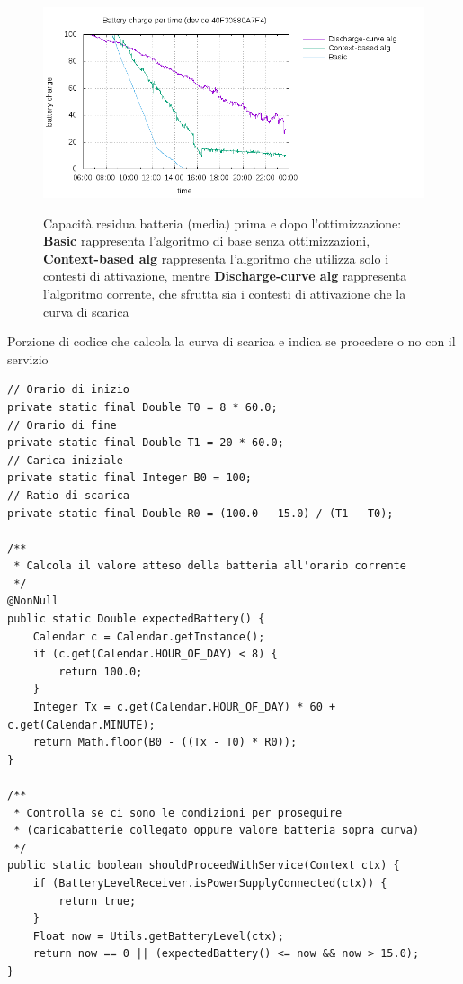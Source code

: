 \documentclass[a4paper,10pt]{memoir}
\begin{document}
\begin{figure}[h]
\centering
\caption{Capacità residua batteria (media) prima e dopo l'ottimizzazione: \textbf{Basic} rappresenta l'algoritmo di base senza ottimizzazioni, \textbf{Context-based alg} rappresenta l'algoritmo che utilizza solo i contesti di attivazione, mentre \textbf{Discharge-curve alg} rappresenta l'algoritmo corrente, che sfrutta sia i contesti di attivazione che la curva di scarica}
\includegraphics[width=\textwidth]{database/batteryplot}
\label{fig:batterychart}
\end{figure}

\clearpage

\begin{listing}[H]
\caption{Porzione di codice che calcola la curva di scarica e indica se procedere o no con il servizio}
\begin{verbatim}
// Orario di inizio
private static final Double T0 = 8 * 60.0;
// Orario di fine
private static final Double T1 = 20 * 60.0;
// Carica iniziale
private static final Integer B0 = 100;
// Ratio di scarica
private static final Double R0 = (100.0 - 15.0) / (T1 - T0);

/**
 * Calcola il valore atteso della batteria all'orario corrente
 */
@NonNull
public static Double expectedBattery() {
	Calendar c = Calendar.getInstance();
	if (c.get(Calendar.HOUR_OF_DAY) < 8) {
		return 100.0;
	}
	Integer Tx = c.get(Calendar.HOUR_OF_DAY) * 60 + c.get(Calendar.MINUTE);
	return Math.floor(B0 - ((Tx - T0) * R0));
}

/**
 * Controlla se ci sono le condizioni per proseguire
 * (caricabatterie collegato oppure valore batteria sopra curva)
 */
public static boolean shouldProceedWithService(Context ctx) {
	if (BatteryLevelReceiver.isPowerSupplyConnected(ctx)) {
		return true;
	}
	Float now = Utils.getBatteryLevel(ctx);
	return now == 0 || (expectedBattery() <= now && now > 15.0);
}
\end{verbatim}
\end{listing}
\end{document}
